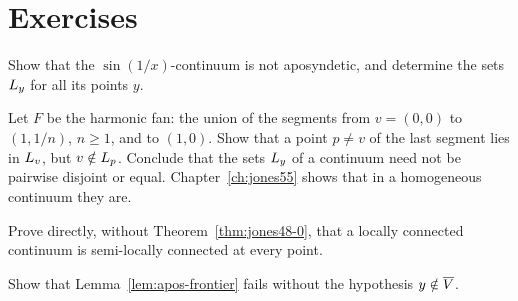 
\section*{Exercises}

\begin{exercise}
Show that the $\sin(1/x)$-continuum is not aposyndetic, and determine the sets $L_{y}$ for all its points
$y$.
\end{exercise}

\begin{exercise}
Let $F$ be the harmonic fan: the union of the segments from $v=(0,0)$ to $(1,1/n)$, $n\ge1$, and to $(1,0)$.
Show that a point $p\neq v$ of the last segment lies in $L_{v}$, but $v\notin L_{p}$. Conclude that the sets $L_{y}$ of a
continuum need not be pairwise disjoint or equal. Chapter~\ref{ch:jones55} shows that in a homogeneous continuum they
are.
\end{exercise}

\begin{exercise}
Prove directly, without Theorem~\ref{thm:jones48-0}, that a locally connected continuum is semi-locally
connected at every point.
\end{exercise}

\begin{exercise}
Show that Lemma~\ref{lem:apos-frontier} fails without the hypothesis $y\notin\overline{V}$.
\end{exercise}
